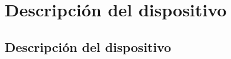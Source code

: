 \chapter{Descripción del dispositivo}  \label{cap:DescripcionDispositivo}

\section{Descripción del dispositivo}






